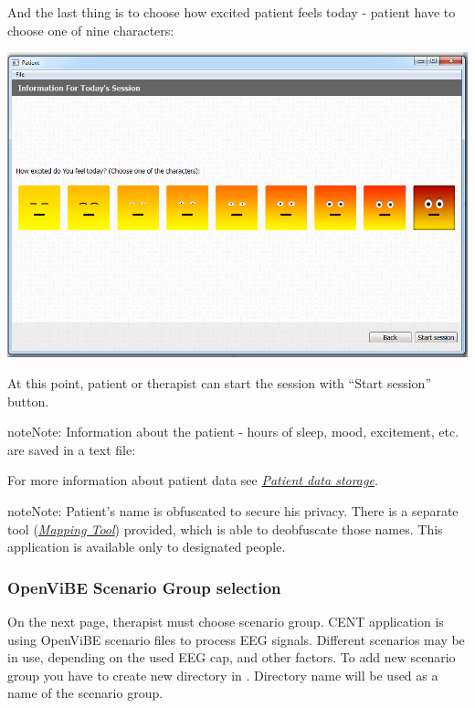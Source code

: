 \documentclass[letterpaper,10pt,english]{sphinxmanual}
\begin{document}
And the last thing is to choose how excited patient feels today - patient have to choose one of nine characters:

{\hfill\includegraphics{Excited.PNG}\hfill}

At this point, patient or therapist can start the session with ``Start session'' button.

\begin{notice}{note}{Note:}
Information about the patient - hours of sleep, mood, excitement, etc. are saved in a text file:


For more information about patient data see {\hyperref[index:patient-data-storage]{\emph{Patient data storage}}}.
\end{notice}

\begin{notice}{note}{Note:}
Patient's name is obfuscated to secure his privacy. There is a separate tool ({\hyperref[index:mapping-tool]{\emph{Mapping Tool}}})  provided, which is able to deobfuscate those names. This application is available only to designated people.
\end{notice}


\subsubsection{OpenViBE Scenario Group selection}
\label{index:openvibe-scenario-group-selection}
On the next page, therapist must choose scenario group. CENT application is using OpenViBE scenario files to process EEG signals. Different scenarios may be in use, depending on the used EEG cap, and other factors. To add new scenario group you have to create new directory in . Directory name will be used as a name of the scenario group.
\end{document}
